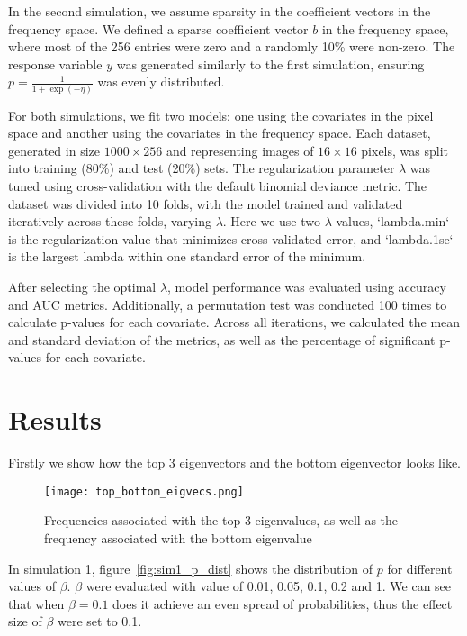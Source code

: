 \documentclass[12pt]{article}
\begin{document}
In the second simulation, we assume sparsity in the coefficient vectors in the
frequency space. We defined a sparse coefficient vector \( b \) in the
frequency space, where most of the 256 entries were zero and a randomly 10\%
were non-zero. The response variable \( y \) was generated similarly to the
first simulation, ensuring \( p = \frac{1}{1 + \exp(-\eta)} \) was evenly
distributed.

For both simulations, we fit two models: one using the covariates in the pixel
space and another using the covariates in the frequency space. Each dataset,
generated in size \( 1000 \times 256 \) and representing images of \( 16 \times
16 \) pixels, was split into training (80\%) and test (20\%) sets. The
regularization parameter \( \lambda \) was tuned using cross-validation with
the default binomial deviance metric. The dataset was divided into 10 folds,
with the model trained and validated iteratively across these folds, varying \(
\lambda \). Here we use two \( \lambda \) values, `lambda.min` is the
regularization value that minimizes cross-validated error, and `lambda.1se` is
the largest lambda within one standard error of the minimum.

After selecting the optimal \( \lambda \), model performance was evaluated
using accuracy and AUC metrics. Additionally, a permutation test was conducted
100 times to calculate p-values for each covariate. Across all iterations, we
calculated the mean and standard deviation of the metrics, as well as the
percentage of significant p-values for each covariate.


\section*{Results}

Firstly we show how the top 3 eigenvectors and the bottom eigenvector looks
like.

\begin{figure}[H] 
	\centering
	\texttt{[image: top\_bottom\_eigvecs.png]} 
	\caption{Frequencies associated with the top 3 eigenvalues, as well as the
	frequency associated with the bottom eigenvalue}
	\label{fig:top_bottom_eigvecs} 
\end{figure}

In simulation 1, figure~\ref{fig:sim1_p_dist} shows the distribution of 
\( p \) for different values of \( \beta	\). \( \beta \) were evaluated with
value of 0.01, 0.05, 0.1, 0.2 and 1. We can see that when \( \beta = 0.1 \) does
it achieve an even spread of probabilities, thus the effect size of \( \beta \)
were set to 0.1.
\end{document}

